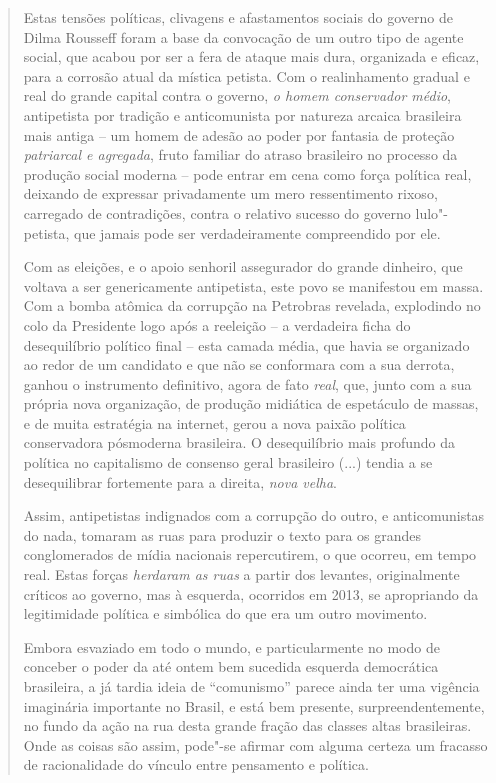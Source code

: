 \begin{quote}
Estas tensões políticas, clivagens e afastamentos sociais do governo
de Dilma Rousseff foram a base da convocação de um outro tipo de agente
social, que acabou por ser a fera de ataque mais dura, organizada e
eficaz, para a corrosão atual da mística petista. Com o realinhamento
gradual e real do grande capital contra o governo, \emph{o homem
conservador médio}, antipetista por tradição e anticomunista por
natureza arcaica brasileira mais antiga -- um homem de adesão ao poder
por fantasia de proteção \emph{patriarcal e agregada}, fruto familiar do
atraso brasileiro no processo da produção social moderna -- pode entrar
em cena como força política real, deixando de expressar privadamente um
mero ressentimento rixoso, carregado de contradições, contra o relativo
sucesso do governo lulo"-petista, que jamais pode ser verdadeiramente
compreendido por ele.

Com as eleições, e o apoio senhoril assegurador do grande dinheiro, que
voltava a ser genericamente antipetista, este povo se manifestou em
massa. Com a bomba atômica da corrupção na Petrobras revelada,
explodindo no colo da Presidente logo após a reeleição -- a verdadeira
ficha do desequilíbrio político final -- esta camada média, que havia se
organizado ao redor de um candidato e que não se conformara com a sua
derrota, ganhou o instrumento definitivo, agora de fato \emph{real},
que, junto com a sua própria nova organização, de produção midiática de
espetáculo de massas, e de muita estratégia na internet, gerou a nova
paixão política conservadora pósmoderna brasileira. O desequilíbrio mais
profundo da política no capitalismo de consenso geral brasileiro (...)
tendia a se desequilibrar fortemente para a direita, \emph{nova velha}.

Assim, antipetistas indignados com a corrupção do outro, e
anticomunistas do nada, tomaram as ruas para produzir o texto para os
grandes conglomerados de mídia nacionais repercutirem, o que ocorreu, em
tempo real. Estas forças \emph{herdaram as ruas} a partir dos levantes,
originalmente críticos ao governo, mas à esquerda, ocorridos em 2013, se
apropriando da legitimidade política e simbólica do que era um outro
movimento.

Embora esvaziado em todo o mundo, e particularmente no modo de conceber
o poder da até ontem bem sucedida esquerda democrática brasileira, a já
tardia ideia de ``comunismo'' parece ainda ter uma vigência imaginária
importante no Brasil, e está bem presente, surpreendentemente, no fundo
da ação na rua desta grande fração das classes altas brasileiras. Onde
as coisas são assim, pode"-se afirmar com alguma certeza um fracasso de
racionalidade do vínculo entre pensamento e política.


\end{quote}
